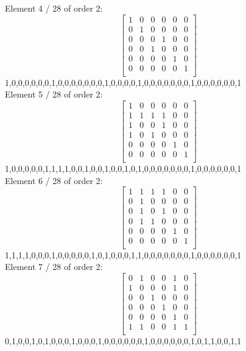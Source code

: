 Element     4 / 28 of order 2:
$$
\left[
\begin{array}{*{6}{r}}
1 & 0 & 0 & 0 & 0 & 0\\
0 & 1 & 0 & 0 & 0 & 0\\
0 & 0 & 0 & 1 & 0 & 0\\
0 & 0 & 1 & 0 & 0 & 0\\
0 & 0 & 0 & 0 & 1 & 0\\
0 & 0 & 0 & 0 & 0 & 1\\
\end{array}
\right]
$$
1,0,0,0,0,0,0,1,0,0,0,0,0,0,0,1,0,0,0,0,1,0,0,0,0,0,0,0,1,0,0,0,0,0,0,1\\
Element     5 / 28 of order 2:
$$
\left[
\begin{array}{*{6}{r}}
1 & 0 & 0 & 0 & 0 & 0\\
1 & 1 & 1 & 1 & 0 & 0\\
1 & 0 & 0 & 1 & 0 & 0\\
1 & 0 & 1 & 0 & 0 & 0\\
0 & 0 & 0 & 0 & 1 & 0\\
0 & 0 & 0 & 0 & 0 & 1\\
\end{array}
\right]
$$
1,0,0,0,0,0,1,1,1,1,0,0,1,0,0,1,0,0,1,0,1,0,0,0,0,0,0,0,1,0,0,0,0,0,0,1\\
Element     6 / 28 of order 2:
$$
\left[
\begin{array}{*{6}{r}}
1 & 1 & 1 & 1 & 0 & 0\\
0 & 1 & 0 & 0 & 0 & 0\\
0 & 1 & 0 & 1 & 0 & 0\\
0 & 1 & 1 & 0 & 0 & 0\\
0 & 0 & 0 & 0 & 1 & 0\\
0 & 0 & 0 & 0 & 0 & 1\\
\end{array}
\right]
$$
1,1,1,1,0,0,0,1,0,0,0,0,0,1,0,1,0,0,0,1,1,0,0,0,0,0,0,0,1,0,0,0,0,0,0,1\\
Element     7 / 28 of order 2:
$$
\left[
\begin{array}{*{6}{r}}
0 & 1 & 0 & 0 & 1 & 0\\
1 & 0 & 0 & 0 & 1 & 0\\
0 & 0 & 1 & 0 & 0 & 0\\
0 & 0 & 0 & 1 & 0 & 0\\
0 & 0 & 0 & 0 & 1 & 0\\
1 & 1 & 0 & 0 & 1 & 1\\
\end{array}
\right]
$$
0,1,0,0,1,0,1,0,0,0,1,0,0,0,1,0,0,0,0,0,0,1,0,0,0,0,0,0,1,0,1,1,0,0,1,1\\
